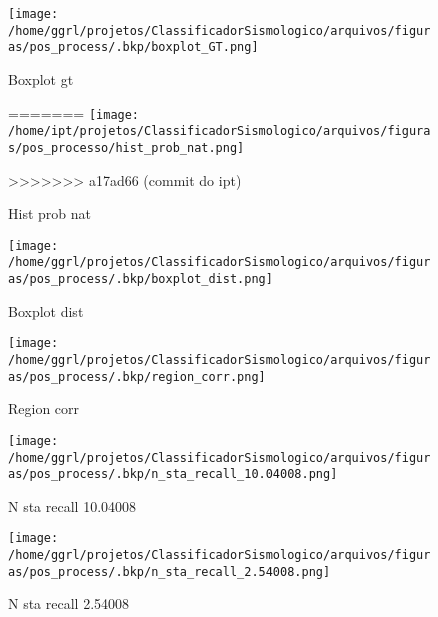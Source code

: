                     \begin{figure}[H]
                        \centering
                        \texttt{[image: /home/ggrl/projetos/ClassificadorSismologico/arquivos/figuras/pos\_process/.bkp/boxplot\_GT.png]}
                        \caption{Boxplot gt}
                        \label{fig:boxplot_GT}
=======
                        \texttt{[image: /home/ipt/projetos/ClassificadorSismologico/arquivos/figuras/pos\_processo/hist\_prob\_nat.png]}
                        \caption{Hist prob nat}
                        \label{fig:hist_prob_nat}
>>>>>>> a17ad66 (commit do ipt)
                    \end{figure}
                

                    \begin{figure}[H]
                        \centering
                        \texttt{[image: /home/ggrl/projetos/ClassificadorSismologico/arquivos/figuras/pos\_process/.bkp/boxplot\_dist.png]}
                        \caption{Boxplot dist}
                        \label{fig:boxplot_dist}
                    \end{figure}
                

                    \begin{figure}[H]
                        \centering
                        \texttt{[image: /home/ggrl/projetos/ClassificadorSismologico/arquivos/figuras/pos\_process/.bkp/region\_corr.png]}
                        \caption{Region corr}
                        \label{fig:region_corr}
                    \end{figure}
                

                    \begin{figure}[H]
                        \centering
                        \texttt{[image: /home/ggrl/projetos/ClassificadorSismologico/arquivos/figuras/pos\_process/.bkp/n\_sta\_recall\_10.04008.png]}
                        \caption{N sta recall 10.04008}
                        \label{fig:n_sta_recall_10.04008}
                    \end{figure}
                

                    \begin{figure}[H]
                        \centering
                        \texttt{[image: /home/ggrl/projetos/ClassificadorSismologico/arquivos/figuras/pos\_process/.bkp/n\_sta\_recall\_2.54008.png]}
                        \caption{N sta recall 2.54008}
                        \label{fig:n_sta_recall_2.54008}
                    \end{figure}
                

